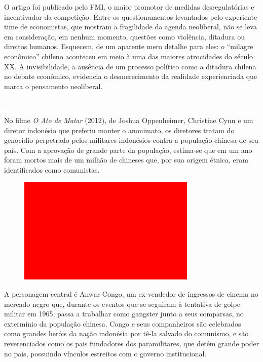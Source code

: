 O artigo foi publicado pelo FMI, o maior promotor de medidas
desregulatórias e incentivador da competição. Entre os questionamentos
levantados pelo experiente time de economistas, que mostram a
fragilidade da agenda neoliberal, não se leva em consideração, em nenhum
momento, questões como violência, ditadura ou direitos humanos.
Esquecem, de um aparente mero detalhe para eles: o ``milagre econômico''
chileno aconteceu em meio à uma das maiores atrocidades do século XX. A
invisibilidade, a ausência de um processo político como a ditadura
chilena no debate econômico, evidencia o desmerecimento da realidade
experienciada que marca o pensamento neoliberal.

-

No filme \emph{O Ato de Matar} (2012), de Joshua Oppenheimer, Christine
Cynn e um diretor indonésio que preferiu manter o anonimato, os
diretores tratam do genocídio perpetrado pelos militares indonésios
contra a população chinesa de seu país. Com a aprovação de grande parte
da população, estima-se que em um ano foram mortos mais de um milhão de
chineses que, por sua origem étnica, eram identificados como comunistas.

\begin{figure}[!ht]
\centering
 \includegraphics[width=85mm]{./imgs/im1.jpg}
\caption{\footnotesize{}}
\end{figure}


A personagem central é Anwar Congo, um ex-vendedor de ingressos de
cinema no mercado negro que, durante os eventos que se seguiram à
tentativa de golpe militar em 1965, passa a trabalhar como gangster
junto a seus comparsas, no extermínio da população chinesa. Congo e seus
companheiros são celebrados como grandes heróis da nação indonésia por
tê-la salvado do comunismo, e são reverenciados como os pais fundadores
dos paramilitares, que detém grande poder no país, possuindo vínculos
estreitos com o governo institucional.

